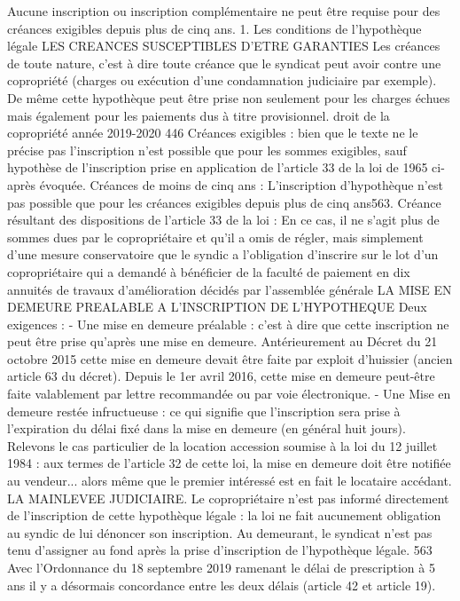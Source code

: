Aucune inscription ou inscription complémentaire ne peut être requise pour des créances exigibles depuis plus de cinq ans.
1. Les conditions de l’hypothèque légale
LES CREANCES SUSCEPTIBLES D’ETRE GARANTIES
Les créances de toute nature, c'est à dire toute créance que le syndicat peut avoir contre une copropriété (charges ou exécution d'une condamnation judiciaire par exemple). De même cette hypothèque peut être prise non seulement pour les charges échues mais également pour les paiements dus à titre provisionnel.
droit de la copropriété année 2019-2020
446
Créances exigibles : bien que le texte ne le précise pas l'inscription n'est possible que pour les sommes exigibles, sauf hypothèse de l'inscription prise en application de l'article 33 de la loi de 1965 ci-après évoquée.
Créances de moins de cinq ans : L’inscription d'hypothèque n’est pas possible que pour les créances exigibles depuis plus de cinq ans563.
Créance résultant des dispositions de l’article 33 de la loi : En ce cas, il ne s'agit plus de sommes dues par le copropriétaire et qu'il a omis de régler, mais simplement d'une mesure conservatoire que le syndic a l’obligation d’inscrire sur le lot d'un copropriétaire qui a demandé à bénéficier de la faculté de paiement en dix annuités de travaux d'amélioration décidés par l'assemblée générale
LA MISE EN DEMEURE PREALABLE A L’INSCRIPTION DE L’HYPOTHEQUE
Deux exigences :
- Une mise en demeure préalable : c'est à dire que cette inscription ne peut être prise qu'après une mise en demeure. Antérieurement au Décret du 21 octobre 2015 cette mise en demeure devait être faite par exploit d'huissier (ancien article 63 du décret). Depuis le 1er avril 2016, cette mise en demeure peut-être faite valablement par lettre recommandée ou par voie électronique.
- Une Mise en demeure restée infructueuse : ce qui signifie que l'inscription sera prise à l'expiration du délai fixé dans la mise en demeure (en général huit jours).
Relevons le cas particulier de la location accession soumise à la loi du 12 juillet 1984 : aux termes de l'article 32 de cette loi, la mise en demeure doit être notifiée au vendeur... alors même que le premier intéressé est en fait le locataire accédant.
LA MAINLEVEE JUDICIAIRE.
Le copropriétaire n'est pas informé directement de l'inscription de cette hypothèque légale : la loi ne fait aucunement obligation au syndic de lui dénoncer son inscription.
Au demeurant, le syndicat n'est pas tenu d'assigner au fond après la prise d'inscription de l'hypothèque légale.
563 Avec l’Ordonnance du 18 septembre 2019 ramenant le délai de prescription à 5 ans il y a désormais concordance entre les deux délais (article 42 et article 19).
